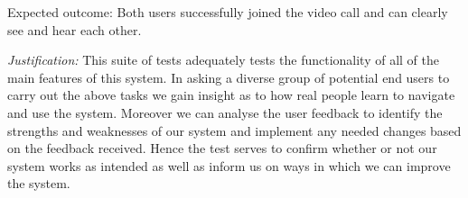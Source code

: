 {\sffamily Expected outcome:} Both users successfully joined the video call
and can clearly see and hear each other.\\

{\color{gray} \hrulefill} \vspace{0.2cm}

\textit{Justification:} This suite of tests adequately tests the
functionality of all of the main features of this system. In asking a 
diverse group of potential end users to carry out the above tasks 
we gain insight as to how real people learn to navigate and use
the system. Moreover we can analyse the user feedback to identify the
strengths and weaknesses of our system and implement any needed changes
based on the feedback received. Hence the test serves to confirm whether 
or not our system works as intended as well as inform us on ways in which
we can improve the system.
